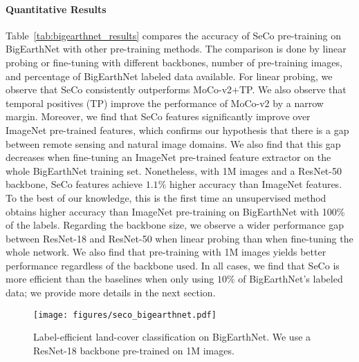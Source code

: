 \documentclass[10pt,twocolumn,letterpaper]{article}
\newcommand{\methodname}[0]{SeCo}
\begin{document}
\vspace{-1em}\paragraph{Quantitative Results}
Table~\ref{tab:bigearthnet_results} compares the accuracy of \methodname{} pre-training on BigEarthNet with other pre-training methods. The comparison is done by linear probing or fine-tuning with different backbones, number of pre-training images, and percentage of BigEarthNet labeled data available. For linear probing, we observe that \methodname{} consistently outperforms MoCo-v2+TP. We also observe that temporal positives (TP) improve the performance of MoCo-v2 by a narrow margin. Moreover, we find that \methodname{} features significantly improve over ImageNet pre-trained features, which confirms our hypothesis that there is a gap between remote sensing and natural image domains. We also find that this gap decreases when fine-tuning an ImageNet pre-trained feature extractor on the whole BigEarthNet training set. Nonetheless, with 1M images and a ResNet-50 backbone, \methodname{} features achieve $1.1\%$ higher accuracy than ImageNet features. To the best of our knowledge, this is the first time an unsupervised method obtains higher accuracy than ImageNet pre-training on BigEarthNet with 100\% of the labels. Regarding the backbone size, we observe a wider performance gap between ResNet-18 and ResNet-50 when linear probing than when fine-tuning the whole network. We also find that pre-training with 1M images yields better performance regardless of the backbone used. In all cases, we find that \methodname{} is more efficient than the baselines when only using $10\%$ of BigEarthNet's labeled data; we provide more details in the next section.

\begin{figure}[t]
    \begin{center}
    \texttt{[image: figures/seco\_bigearthnet.pdf]}
    \end{center}
    \caption{Label-efficient land-cover classification on BigEarthNet. We use a ResNet-18 backbone pre-trained on 1M images.}
    \label{fig:bigearthnet_results}
\end{figure}
\end{document}
